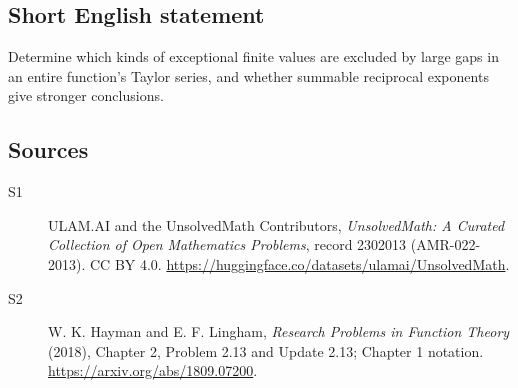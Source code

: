 \documentclass[11pt]{article}
\begin{document}
\subsection{Short English statement}
Determine which kinds of exceptional finite values are excluded by large gaps in an entire function's Taylor series, and whether summable reciprocal exponents give stronger conclusions.
\subsection{Sources}
\begin{description}
\item[\hypertarget{source:2302013:1}{S1}] ULAM.AI and the UnsolvedMath Contributors, \emph{UnsolvedMath: A Curated Collection of Open Mathematics Problems}, record 2302013 (AMR-022-2013). CC BY 4.0. \url{https://huggingface.co/datasets/ulamai/UnsolvedMath}.
\item[\hypertarget{source:2302013:2}{S2}] W. K. Hayman and E. F. Lingham, \emph{Research Problems in Function Theory} (2018), Chapter 2, Problem 2.13 and Update 2.13; Chapter 1 notation. \url{https://arxiv.org/abs/1809.07200}.
\end{description}
\label{end:2302013}
\end{document}

